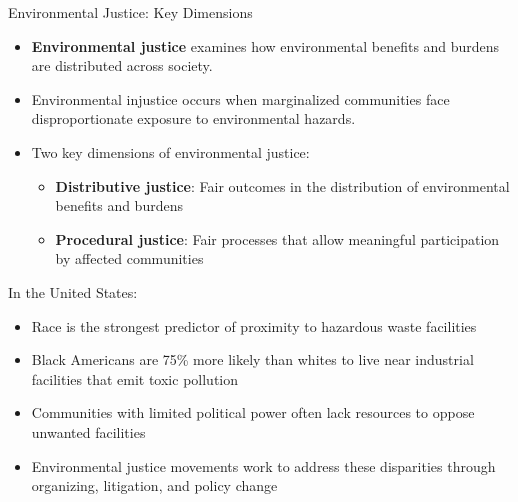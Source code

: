 \documentclass{beamer}
\begin{document}
	\begin{frame}{Environmental Justice: Key Dimensions}
		\begin{itemize}
			\item \textbf{Environmental justice} examines how environmental benefits and burdens are distributed across society.
			\item Environmental injustice occurs when marginalized communities face disproportionate exposure to environmental hazards.
			\item Two key dimensions of environmental justice:
			\begin{itemize}
				\item \textbf{Distributive justice}: Fair outcomes in the distribution of environmental benefits and burdens
				\item \textbf{Procedural justice}: Fair processes that allow meaningful participation by affected communities
			\end{itemize}
		\end{itemize}
		\begin{example}
			\scriptsize
			In the United States:
			\begin{itemize}
				\item Race is the strongest predictor of proximity to hazardous waste facilities
				\item Black Americans are 75\% more likely than whites to live near industrial facilities that emit toxic pollution
				\item Communities with limited political power often lack resources to oppose unwanted facilities
				\item Environmental justice movements work to address these disparities through organizing, litigation, and policy change
			\end{itemize}
		\end{example}
	\end{frame}
	
\end{document}
